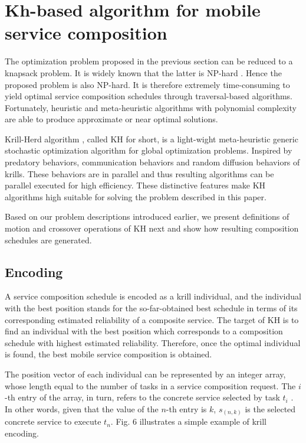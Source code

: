 \documentclass[journal]{IEEEtran}
\begin{document}
\section{Kh-based algorithm for mobile service composition}

The optimization problem proposed in the previous section can be reduced to a knapsack problem. It is widely known that the latter is NP-hard \cite{papadimitriou1998combinatorial}. Hence the proposed problem is also NP-hard. It is therefore extremely time-consuming to yield optimal service composition schedules through traversal-based algorithms. Fortunately, heuristic and meta-heuristic algorithms with polynomial complexity are able to produce approximate or near optimal solutions.

Krill-Herd algorithm \cite{gandomi2012krill}, called KH for short, is a light-wight meta-heuristic generic stochastic optimization algorithm for global optimization problems. Inspired by predatory behaviors, communication behaviors and random diffusion behaviors of krills. 
These behaviors are in parallel and thus resulting algorithms can be parallel executed for high efficiency. These distinctive features make KH algorithms high suitable for solving the problem described in this paper.

Based on our problem descriptions introduced earlier, we present definitions of motion and crossover operations of KH next and show how resulting composition schedules are generated.

\subsection{Encoding}
A service composition schedule is encoded as a krill individual, and the individual with the best position stands for the so-far-obtained best schedule in terms of its corresponding estimated reliability of a composite service. The target of KH is to find an individual with the best position which corresponds to a composition schedule with highest estimated reliability. Therefore, once the optimal individual is found, the best mobile service composition is obtained.

The position vector of each individual can be represented by an integer array, whose length equal to the number of tasks in a service composition request. The $i$-th entry of the array, in turn, refers to the concrete service selected by task $t_i$ . In other words, given that the value of the $n$-th entry is $k$, $s_{(n,k)}$ is the selected concrete service to execute $t_n$. Fig. 6 illustrates a simple example of  krill encoding.
\end{document}
